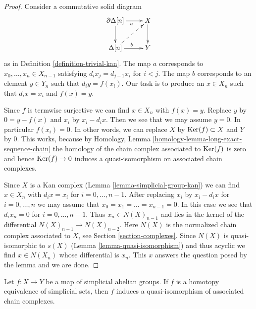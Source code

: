 \begin{proof}
Consider a commutative solid diagram
$$
\xymatrix{
\partial \Delta[n] \ar[r]_a \ar[d] & X \ar[d] \\
\Delta[n] \ar[r]^b \ar@{-->}[ru] & Y
}
$$
as in Definition \ref{definition-trivial-kan}. The map $a$ corresponds
to $x_0, \ldots, x_n \in X_{n - 1}$ satisfying $d_i x_j = d_{j - 1} x_i$
for $i < j$. The map $b$ corresponds to an element $y \in Y_n$ such
that $d_iy = f(x_i)$. Our task is to produce an $x \in X_n$ such that
$d_ix = x_i$ and $f(x) = y$.

\medskip\noindent
Since $f$ is termwise surjective we can find $x \in X_n$ with $f(x) = y$.
Replace $y$ by $0 = y - f(x)$ and $x_i$ by $x_i - d_ix$. Then we
see that we may assume $y = 0$. In particular $f(x_i) = 0$.
In other words, we can replace $X$ by $\mathop{\mathrm{Ker}}(f) \subset X$
and $Y$ by $0$. This works, because by
Homology, Lemma \ref{homology-lemma-long-exact-sequence-chain}
the homology of the chain complex associated to $\mathop{\mathrm{Ker}}(f)$
is zero and hence $\mathop{\mathrm{Ker}}(f) \to 0$ induces a quasi-isomorphism
on associated chain complexes.

\medskip\noindent
Since $X$ is a Kan complex (Lemma \ref{lemma-simplicial-group-kan})
we can find $x \in X_n$ with $d_i x = x_i$ for $i = 0, \ldots, n - 1$.
After replacing $x_i$ by $x_i - d_ix$ for $i = 0, \ldots, n$ we
may assume that $x_0 = x_1 = \ldots = x_{n - 1} = 0$.
In this case we see that $d_i x_n = 0$ for $i = 0, \ldots, n - 1$.
Thus $x_n \in N(X)_{n - 1}$ and lies in the kernel of the differential
$N(X)_{n - 1} \to N(X)_{n - 2}$. Here $N(X)$ is the normalized chain
complex associated to $X$, see Section \ref{section-complexes}.
Since $N(X)$ is quasi-isomorphic to $s(X)$
(Lemma \ref{lemma-quasi-isomorphism})
and thus acyclic we find $x \in N(X_n)$ whose differential is $x_n$.
This $x$ answers the question posed by the lemma and we are done.
\end{proof}

\begin{lemma}
\label{lemma-homotopy-equivalence}
Let $f : X \to Y$ be a map of simplicial abelian groups. If $f$ is a
homotopy equivalence of simplicial sets, then $f$ induces a
quasi-isomorphism of associated chain complexes.
\end{lemma}

